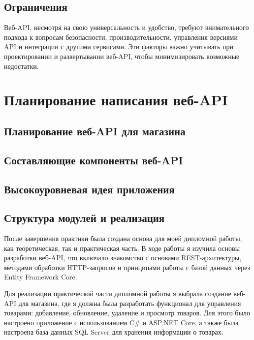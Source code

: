 \documentclass[a4paper,12pt]{report}
\begin{document}
\subsection{Ограничения}

Веб-API, несмотря на свою универсальность и удобство, требуют внимательного подхода к вопросам безопасности, 
производительности, управления версиями API и интеграции с другими сервисами. Эти факторы важно учитывать 
при проектировании и развертывании веб-API, чтобы минимизировать возможные недостатки.







\section{Планирование написания веб-API}

\subsection{Планирование веб-API для магазина}
\subsection{Составляющие компоненты веб-API}
\subsection{Высокоуровневая идея приложения}
\subsection{Структура модулей и реализация}







После завершения практики была создана основа для моей дипломной работы, как теоретическая, так и практическая часть. 
В ходе работы я изучила основы разработки веб-API, что включало знакомство с основами REST-архитектуры, методами обработки 
HTTP-запросов и принципами работы с базой данных через Entity Framework Core.

Для реализации практической части дипломной работы я выбрала создание веб-API для магазина, где я должна была разработать 
функционал для управления товарами: добавление, обновление, удаление и просмотр товаров. Для этого было настроено приложение 
с использованием C\# и ASP.NET Core, а также была настроена база данных SQL Server для хранения информации о товарах.
\end{document}
